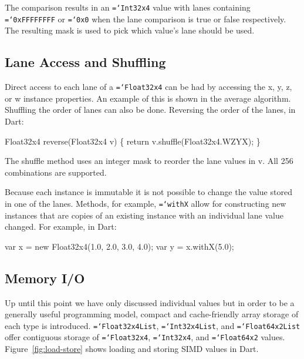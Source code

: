 \documentclass{sigplanconf}
\newcommand{\ttt}[1]{{\texttt{\hyphenchar\font=`\-\relax #1}}}%
\begin{document}
The comparison results in an \ttt{Int32x4} value with lanes containing
\ttt{0xFFFFFFFF} or \ttt{0x0} when the lane comparison is true or false
respectively. The resulting mask is used to pick which value's lane should be
used.

\subsection{Lane Access and Shuffling}

Direct access to each lane of a \ttt{Float32x4} can be had by accessing the x,
y, z, or w instance properties. An example of this is shown in the average
algorithm. Shuffling the order of lanes can also be done. Reversing the order of
the lanes, in Dart:

\begin{small}
\begin{program}[style=tt]
Fl\tab{}oat32x4 reverse(Float32x4 v) \{
  return v.shuffle(Float32x4.WZYX);\untab{}
\}
\end{program}
\end{small}

The shuffle method uses an integer mask to reorder the lane values in v. All 256
combinations are supported.

Because each instance is immutable it is not possible to change the value stored
in one of the lanes. Methods, for example, \ttt{withX} allow for constructing
new instances that are copies of an existing instance with an individual lane
value changed. For example, in Dart:

\begin{small}
\begin{program}[style=tt]
var x = new Float32x4(1.0, 2.0, 3.0, 4.0);
var y = x.withX(5.0);
\end{program}
\end{small}

\subsection{Memory I/O}

Up until this point we have only discussed individual values but in order to be
a generally useful programming model, compact and cache-friendly array storage
of each type is introduced. \ttt{Float32x4List}, \ttt{Int32x4List}, and
\ttt{Float64x2List} offer contiguous storage of \ttt{Float32x4}, \ttt{Int32x4},
and \ttt{Float64x2} values. Figure~\ref{fig:load-store} shows loading and
storing SIMD values in Dart.
\end{document}
